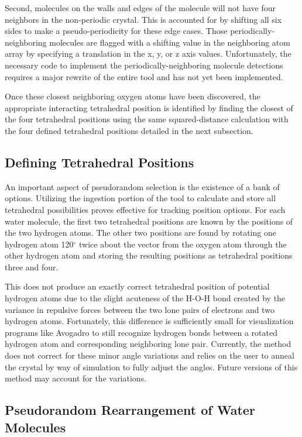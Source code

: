 Second, molecules on the walls and edges of the molecule will not have four neighbors in the non-periodic crystal. 
This is accounted for by shifting all six sides to make a pseudo-periodicity for these edge cases. 
Those periodically-neighboring molecules are flagged with a shifting value in the neighboring atom array by specifying a translation in the x, y, or z axis values. 
Unfortunately, the necessary code to implement the periodically-neighboring molecule detections requires a major rewrite of the entire tool and has not yet been implemented.

Once these closest neighboring oxygen atoms have been discovered, the appropriate interacting tetrahedral position is identified by finding the closest of the four tetrahedral positions using the same squared-distance calculation with the four defined tetrahedral positions detailed in the next subsection.

\subsection{Defining Tetrahedral Positions}

An important aspect of pseudorandom selection is the existence of a bank of options.
Utilizing the ingestion portion of the tool to calculate and store all tetrahedral possibilities proves effective for tracking position options.
For each water molecule, the first two tetrahedral positions are known by the positions of the two hydrogen atoms. 
The other two positions are found by rotating one hydrogen atom 120$^{\circ}$ twice about the vector from the oxygen atom through the other hydrogen atom and storing the resulting positions as tetrahedral positions three and four. 

This does not produce an exactly correct tetrahedral position of potential hydrogen atoms due to the slight acuteness of the H-O-H bond created by the variance in repulsive forces between the two lone pairs of electrons and two hydrogen atoms. 
Fortunately, this difference is sufficiently small for visualization programs like Avogadro to still recognize hydrogen bonds between a rotated hydrogen atom and corresponding neighboring lone pair. 
Currently, the method does not correct for these minor angle variations and relies on the user to anneal the crystal by way of simulation to fully adjust the angles. 
Future versions of this method may account for the variations.

\subsection{Pseudorandom Rearrangement of Water Molecules}


